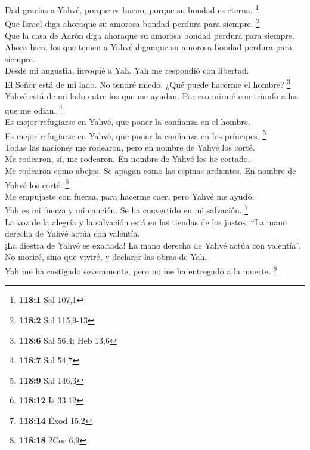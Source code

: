  Dad gracias a Yahvé, porque es bueno, porque su bondad es
eterna. \footnote{\textbf{118:1} Sal 107,1}\\
 Que Israel diga ahoraque su amorosa bondad perdura para
siempre. \footnote{\textbf{118:2} Sal 115,9-13}\\
 Que la casa de Aarón diga ahoraque su amorosa bondad
perdura para siempre.\\
 Ahora bien, los que temen a Yahvé diganque su amorosa
bondad perdura para siempre.\\
 Desde mi angustia, invoqué a Yah. Yah me respondió con
libertad.\\
 El Señor está de mi lado. No tendré miedo. ¿Qué puede
hacerme el hombre? \footnote{\textbf{118:6} Sal 56,4; Heb 13,6}\\
 Yahvé está de mi lado entre los que me ayudan. Por eso
miraré con triunfo a los que me odian. \footnote{\textbf{118:7} Sal 54,7}\\
 Es mejor refugiarse en Yahvé, que poner la confianza en
el hombre.\\
 Es mejor refugiarse en Yahvé, que poner la confianza en
los príncipes. \footnote{\textbf{118:9} Sal 146,3}\\
 Todas las naciones me rodearon, pero en nombre de Yahvé
los corté.\\
 Me rodearon, sí, me rodearon. En nombre de Yahvé los he
cortado.\\
 Me rodearon como abejas. Se apagan como las espinas
ardientes. En nombre de Yahvé los corté. \footnote{\textbf{118:12} Is
  33,12}\\
 Me empujaste con fuerza, para hacerme caer, pero Yahvé
me ayudó.\\
 Yah es mi fuerza y mi canción. Se ha convertido en mi
salvación. \footnote{\textbf{118:14} Éxod 15,2}\\
 La voz de la alegría y la salvación está en las tiendas
de los justos. ``La mano derecha de Yahvé actúa con valentía.\\
 ¡La diestra de Yahvé es exaltada! La mano derecha de
Yahvé actúa con valentía''.\\
 No moriré, sino que viviré, y declarar las obras de
Yah.\\
 Yah me ha castigado severamente, pero no me ha entregado
a la muerte. \footnote{\textbf{118:18} 2Cor 6,9}\\
